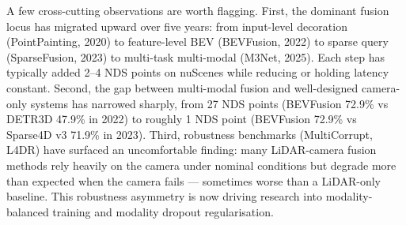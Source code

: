 A few cross-cutting observations are worth flagging. First, the dominant fusion locus has migrated upward over five years: from input-level decoration (PointPainting, 2020) to feature-level BEV (BEVFusion, 2022) to sparse query (SparseFusion, 2023) to multi-task multi-modal (M3Net, 2025). Each step has typically added 2--4 NDS points on nuScenes while reducing or holding latency constant. Second, the gap between multi-modal fusion and well-designed camera-only systems has narrowed sharply, from 27 NDS points (BEVFusion 72.9\% vs DETR3D 47.9\% in 2022) to roughly 1 NDS point (BEVFusion 72.9\% vs Sparse4D v3 71.9\% in 2023). Third, robustness benchmarks (MultiCorrupt, L4DR) have surfaced an uncomfortable finding: many LiDAR-camera fusion methods rely heavily on the camera under nominal conditions but degrade more than expected when the camera fails --- sometimes worse than a LiDAR-only baseline. This robustness asymmetry is now driving research into modality-balanced training and modality dropout regularisation.

